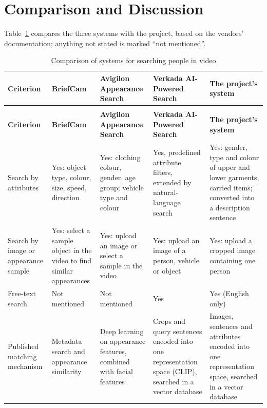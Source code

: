 \section{Comparison and Discussion}
\label{sec:2.2}

Table~\ref{tab:related-comparison} compares the three systems with the project, based on the vendors' documentation; anything not stated is marked ``not mentioned''.

\begin{longtable}{|>{\raggedright\arraybackslash}p{2.2cm}|>{\raggedright\arraybackslash}p{2.85cm}|>{\raggedright\arraybackslash}p{2.85cm}|>{\raggedright\arraybackslash}p{2.85cm}|>{\raggedright\arraybackslash}p{2.85cm}|}
\caption{Comparison of systems for searching people in video}\label{tab:related-comparison}\\
\hline
\textbf{Criterion} & \textbf{BriefCam} & \textbf{Avigilon Appearance Search} & \textbf{Verkada AI-Powered Search} & \textbf{The project's system} \\
\hline
\endfirsthead
\multicolumn{5}{l}{\textit{(continued from Table~\ref{tab:related-comparison})}}\\
\hline
\textbf{Criterion} & \textbf{BriefCam} & \textbf{Avigilon Appearance Search} & \textbf{Verkada AI-Powered Search} & \textbf{The project's system} \\
\hline
\endhead
Search by attributes & Yes: object type, colour, size, speed, direction & Yes: clothing colour, gender, age group; vehicle type and colour & Yes, predefined attribute filters, extended by natural-language search & Yes: gender, type and colour of upper and lower garments, carried items; converted into a description sentence \\
\hline
Search by image or appearance sample & Yes: select a sample object in the video to find similar appearances & Yes: upload an image or select a sample in the video & Yes: upload an image of a person, vehicle or object & Yes: upload a cropped image containing one person \\
\hline
Free-text search & Not mentioned & Not mentioned & Yes & Yes (English only) \\
\hline
Published matching mechanism & Metadata search and appearance similarity & Deep learning on appearance features, combined with facial features & Crops and query sentences encoded into one representation space (CLIP), searched in a vector database & Images, sentences and attributes encoded into one representation space, searched in a vector database \\

\end{longtable}
